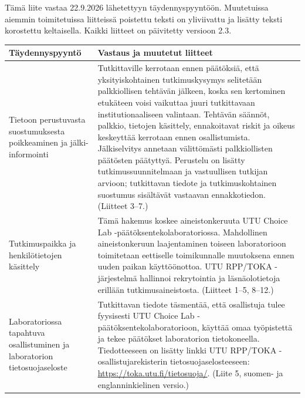 
\renewcommand{\DocumentDate}{24 September 2026}
\renewcommand{\DocumentVersion}{Version 2.3}
\renewcommand{\StudyTitle}{\StudyTitleFI}
\setlength{\emergencystretch}{2em}


Tämä liite vastaa 22.9.2026 lähetettyyn täydennyspyyntöön. Muutetuissa aiemmin toimitetuissa liitteissä poistettu teksti on yliviivattu ja lisätty teksti korostettu keltaisella. Kaikki liitteet on päivitetty versioon 2.3. 

\footnotesize
\begin{longtable}{@{}L{0.28\textwidth}L{0.62\textwidth}@{}}
\toprule
Täydennyspyyntö & Vastaus ja muutetut liitteet \\
\midrule
\endhead
Tietoon perustuvasta suostumuksesta poikkeaminen ja jälki-informointi & Tutkittaville kerrotaan ennen päätöksiä, että yksityiskohtainen tutkimuskysymys selitetään palkkiollisen tehtävän jälkeen, koska sen kertominen etukäteen voisi vaikuttaa juuri tutkittavaan institutionaaliseen valintaan. Tehtävän säännöt, palkkio, tietojen käsittely, ennakoitavat riskit ja oikeus keskeyttää kerrotaan ennen osallistumista. Jälkiselvitys annetaan välittömästi palkkiollisten päätösten päätyttyä. Perustelu on lisätty tutkimussuunnitelmaan ja vastuullisen tutkijan arvioon; tutkittavan tiedote ja tutkimuskohtainen suostumus sisältävät vastaavan ennakkotiedon. (Liitteet 3--7.) \\
Tutkimuspaikka ja henkilötietojen käsittely & Tämä hakemus koskee aineistonkeruuta UTU Choice Lab -päätöksentekolaboratoriossa. Mahdollinen aineistonkeruun laajentaminen toiseen laboratorioon toimitetaan eettiselle toimikunnalle muutoksena ennen uuden paikan käyttöönottoa. UTU RPP/TOKA -järjestelmä hallinnoi rekrytointia ja läsnäolotietoja erillään tutkimusaineistosta. (Liitteet 1--5, 8--12.) \\
Laboratoriossa tapahtuva osallistuminen ja laboratorion tietosuojaseloste & Tutkittavan tiedote täsmentää, että osallistuja tulee fyysisesti UTU Choice Lab -päätöksentekolaboratorioon, käyttää omaa työpistettä ja tekee päätökset laboratorion tietokoneella. Tiedotteeseen on lisätty linkki UTU RPP/TOKA -osallistujarekisterin tietosuojaselosteeseen: \url{https://toka.utu.fi/tietosuoja/}. (Liite 5, suomen- ja englanninkielinen versio.) \\

\end{longtable}
